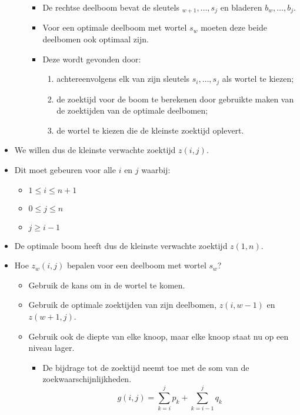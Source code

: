 \begin{itemize}
\begin{itemize}
\begin{itemize}
            \item De rechtse deelboom bevat de sleutels $_{w + 1}, \dots, s_j$ en bladeren $b_{w}, \dots, b_j$.
            \item Voor een optimale deelboom met wortel $s_w$ moeten deze beide deelbomen ook optimaal zijn.
            \item Deze wordt gevonden door:
            \begin{enumerate}
                \item achtereenvolgens elk van zijn sleutels $s_i, \dots, s_j$ als wortel te kiezen;
                \item de zoektijd voor de boom te berekenen door gebruikte maken van de zoektijden van de optimale deelbomen;
                \item de wortel te kiezen die de kleinste zoektijd oplevert.
            \end{enumerate} 
        \end{itemize}
    \end{itemize}
    \item We willen dus de kleinste verwachte zoektijd $z(i, j)$.
    \item Dit moet gebeuren voor alle $i$ en $j$ waarbij:
    \begin{itemize}
        \item $1 \leq i \leq n + 1$
        \item $0 \leq j \leq n$
        \item $j \geq i - 1$
    \end{itemize}
    \item De optimale boom heeft dus de kleinste verwachte zoektijd $z(1, n)$.
    \item Hoe $z_w(i, j)$ bepalen voor een deelboom met wortel $s_w$?
    \begin{itemize}
        \item Gebruik de kans om in de wortel te komen.
        \item Gebruik de optimale zoektijden van zijn deelbomen, $z(i, w - 1)$ en $z(w + 1, j)$.
        \item Gebruik ook de diepte van elke knoop, maar elke knoop staat nu op een niveau lager. 
        \begin{itemize}
            \item De bijdrage tot de zoektijd neemt toe met de som van de zoekwaarschijnlijkheden.
            $$g(i, j) = \sum_{k = i}^{j} p_k + \sum_{k = i - 1}^{j} q_k$$
        \end{itemize}

\end{itemize}
\end{itemize}
